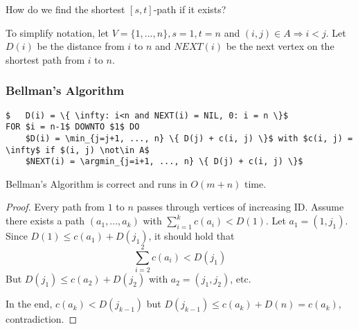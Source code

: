 \begin{qstn}
How do we find the shortest $[s, t]$-path if it exists?
\end{qstn}
To simplify notation, let $V = \{1, ..., n\}, s=1, t=n$ and $(i, j) \in A \Rightarrow i < j$.
Let $D(i)$ be the distance from $i$ to $n$ and $NEXT(i)$ be the next vertex on the shortest path from $i$ to $n$.

\subsubsection*{Bellman's Algorithm}
\begin{lstlisting}
$	D(i) = \{ \infty: i<n and NEXT(i) = NIL, 0: i = n \}$
FOR $i = n-1$ DOWNTO $1$ DO
	$D(i) = \min_{j=j+1, ..., n} \{ D(j) + c(i, j) \}$ with $c(i, j) = \infty$ if $(i, j) \not\in A$
	$NEXT(i) = \argmin_{j=i+1, ..., n} \{ D(j) + c(i, j) \}$
\end{lstlisting}

\begin{thm}
Bellman's Algorithm is correct and runs in $O(m + n)$ time.
\end{thm}
\begin{proof}
Every path from $1$ to $n$ passes through vertices of increasing ID. Assume there exists a path $(a_1, ..., a_k)$ with $\sum_{i=1}^k c(a_i) < D(1)$.
Let $a_1 = (1, j_1)$. Since $D(1) \leq c(a_1) + D(j_1)$, it should hold that
\[ \sum\limits_{i=2}^2 c(a_i) < D(j_1) \]
But $D(j_1) \leq c(a_2) + D(j_2)$ with $a_2 = (j_1, j_2)$, etc.

In the end, $c(a_k) < D(j_{k-1})$ but $D(j_{k-1}) \leq c(a_k) + D(n) = c(a_k)$, contradiction.
\end{proof}
